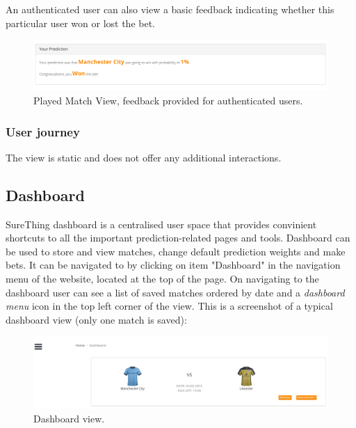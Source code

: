 An authenticated user can also view a basic feedback indicating whether this particular user won or lost the bet.

\begin{figure}[H]
	\begin{center}
		\includegraphics[width=.90\textwidth]{impl/images/feedback}
		\caption{Played Match View, feedback provided for authenticated users.} \label{fig:feedback}
	\end{center}
\end{figure}

\subsubsection*{User journey}
\label{subsec:playedmatchviewuserjourney}
The view is static and does not offer any additional interactions.

\subsection{Dashboard}
\label{subsec:dashboard}
SureThing dashboard is a centralised user space that provides convinient shortcuts to all the important prediction-related pages and tools. Dashboard can be used to store and view matches, change default prediction weights and make bets. It can be navigated to by clicking on item "Dashboard" in the navigation menu of the website, located at the top of the page. On navigating to the dashboard user can see a list of saved matches ordered by date and a \emph{dashboard menu} icon in the top left corner of the view. This is a screenshot of a typical dashboard view (only one match is saved):

\begin{figure}[H]
	\begin{center}
		\includegraphics[width=.90\columnwidth]{impl/images/typicalDashboard}
		\caption{Dashboard view.} \label{fig:typicaldashboard}
	\end{center}
\end{figure}


